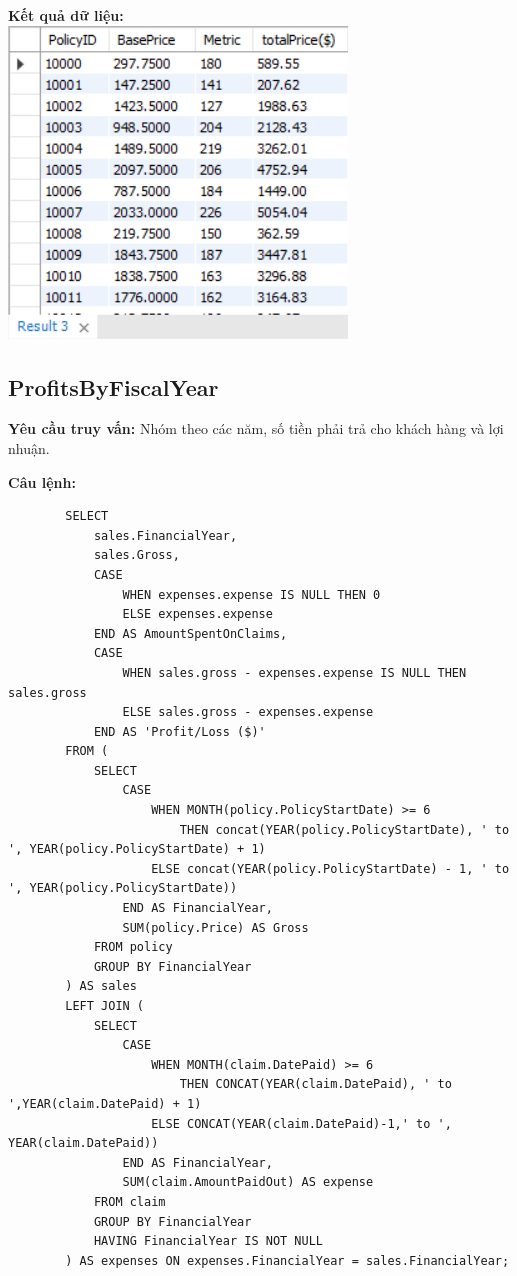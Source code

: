 \documentclass[12pt,a4paper]{report}
\begin{document}
	{\bf Kết quả dữ liệu:}
	\\
	\includegraphics[width=\linewidth]{PriceCalculation}
	
\subsection{ProfitsByFiscalYear}
	{\bf Yêu cầu truy vấn:} Nhóm theo các năm, số tiền phải trả cho khách hàng và lợi nhuận.
	
	{\bf Câu lệnh:}
	\begin{lstlisting}
		SELECT
			sales.FinancialYear,
			sales.Gross,
    		CASE
				WHEN expenses.expense IS NULL THEN 0
        		ELSE expenses.expense
			END AS AmountSpentOnClaims,
    		CASE
				WHEN sales.gross - expenses.expense IS NULL THEN sales.gross
        		ELSE sales.gross - expenses.expense
			END AS 'Profit/Loss ($)'
		FROM (
			SELECT
				CASE
					WHEN MONTH(policy.PolicyStartDate) >= 6
						THEN concat(YEAR(policy.PolicyStartDate), ' to ', YEAR(policy.PolicyStartDate) + 1)
					ELSE concat(YEAR(policy.PolicyStartDate) - 1, ' to ', YEAR(policy.PolicyStartDate))
				END AS FinancialYear,
        		SUM(policy.Price) AS Gross
			FROM policy
			GROUP BY FinancialYear
		) AS sales
		LEFT JOIN (
			SELECT 
				CASE
					WHEN MONTH(claim.DatePaid) >= 6
						THEN CONCAT(YEAR(claim.DatePaid), ' to ',YEAR(claim.DatePaid) + 1)
					ELSE CONCAT(YEAR(claim.DatePaid)-1,' to ', YEAR(claim.DatePaid))
				END AS FinancialYear,
        		SUM(claim.AmountPaidOut) AS expense
			FROM claim
    		GROUP BY FinancialYear
    		HAVING FinancialYear IS NOT NULL
		) AS expenses ON expenses.FinancialYear = sales.FinancialYear;
	\end{lstlisting}
	
\end{document}
